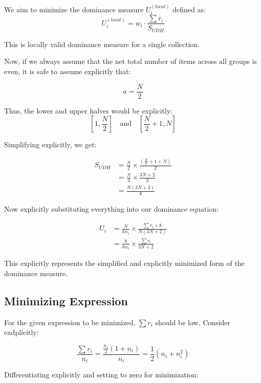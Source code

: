 \documentclass[man,floatsintext]{apa7}
\begin{document}
We aim to minimize the dominance measure $U_i^{(local)}$ defined as:
\begin{equation}
U_i^{(local)} = w_i \cdot \frac{\sum r_i}{S_{UDH}}
\end{equation}

This is locally valid dominance measure for a single collection.

Now, if we always assume that the net total number of items across all groups is even, it is safe to assume explicitly that:

\begin{equation}
a = \frac{N}{2}
\end{equation}

Thus, the lower and upper halves would be explicitly:
\[
\left[1, \frac{N}{2}\right] \quad \text{and} \quad \left[\frac{N}{2}+1, N\right]
\]

Simplifying explicitly, we get:

\begin{align*}
S_{UDH} &= \frac{N}{2} \times \frac{\left(\frac{N}{2} + 1 + N\right)}{2} \\
&= \frac{N}{4} \times \frac{3N + 2}{2} \\
&= \frac{N(3N + 2)}{8}
\end{align*}

Now explicitly substituting everything into our dominance equation:

\begin{align*}
U_i &= \frac{N}{k n_i} \times \frac{\sum r_i \times 8}{N(3N + 2)} \\
&= \frac{8}{k n_i} \times \frac{\sum r_i}{3N + 2}
\end{align*}

This explicitly represents the simplified and explicitly minimized form of the dominance measure.




\subsection*{Minimizing Expression}

For the given expression to be minimized, $\sum r_i$ should be low. Consider exdplicitly:

\begin{equation}
\frac{\sum r_i}{n_i} = \frac{\frac{n_i}{2}(1+n_i)}{n_i} = \frac{1}{2}(n_i + n_i^2)
\end{equation}

Differentiating explicitly and setting to zero for minimization:
\end{document}
